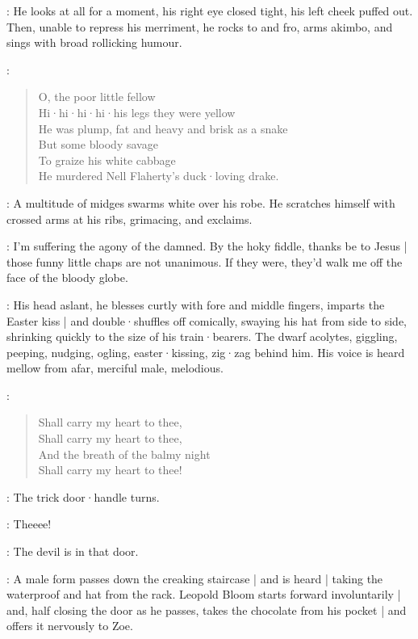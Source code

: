:
He looks at all for a moment,
his right eye closed tight,
his left cheek puffed out.
Then,
unable to repress his merriment,
he rocks to and fro,
%
arms akimbo,
and sings with broad rollicking humour.

\Cardinal:
\begin{verse}
    O, the poor little fellow\\
    Hi·hi·hi·hi·his legs they were yellow\\
    He was plump, fat and heavy and brisk as a snake\\
    But some bloody savage\\
    To graize his white cabbage\\
    He murdered Nell Flaherty's duck·loving drake.
\end{verse}

:
A multitude of midges swarms white over his robe.
He scratches himself with crossed arms at his ribs,
grimacing,
and exclaims.

\Cardinal:
I'm suffering the agony of the damned.
By the hoky fiddle,
thanks be to Jesus |
those funny little chaps are not unanimous.
%
If they were,
they'd walk me off the face of the bloody globe.

:
His head aslant,
he blesses curtly with fore and middle fingers,
imparts the Easter kiss |
and double·shuffles off comically,
swaying his hat from side to side,
shrinking quickly to the size of his train·bearers.
The dwarf acolytes,
giggling,
peeping,
nudging,
ogling,
easter·kissing,
zig·zag behind him.
His voice is heard mellow from afar,
merciful male,
melodious.

\Cardinal:
\begin{verse}
    Shall carry my heart to thee,\\
    Shall carry my heart to thee,\\
%
    And the breath of the balmy night\\
    Shall carry my heart to thee!
\end{verse}

:
The trick door·handle turns.

\Doorhandle:
Theeee!

\Zoe:
The devil is in that door.

:
A male form passes down the creaking staircase |
and is heard |
taking the waterproof and hat from the rack.
Leopold Bloom starts forward involuntarily |
and,
half closing the door as he passes,
takes the chocolate from his pocket |
%
and offers it nervously to Zoe.

